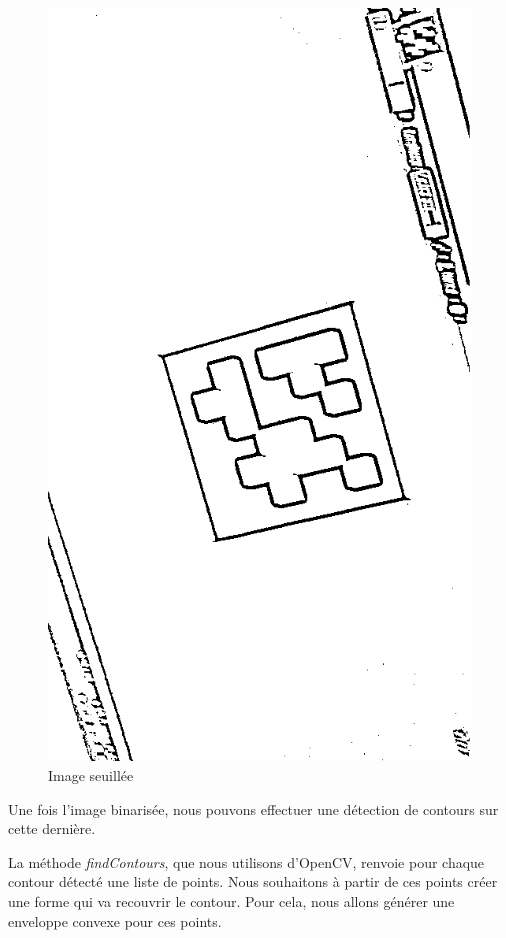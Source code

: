         \begin{figure}[!h]
            \centering
            \includegraphics[scale=0.25]{img/threshold.png}
            \caption{Image seuillée}
        \end{figure}

        Une fois l'image binarisée, nous pouvons effectuer une détection de contours sur cette dernière.

        La méthode \textit{findContours}, que nous utilisons d'OpenCV, renvoie pour chaque contour détecté une liste de points. Nous souhaitons à partir de ces points créer une forme qui va recouvrir le contour. Pour cela, nous allons générer une enveloppe convexe pour ces points.

